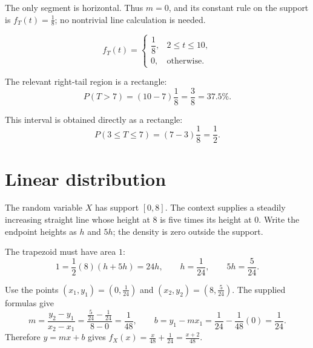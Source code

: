 	The only segment is horizontal.  Thus $m=0$, and its constant rule on the
	support is $f_T(t)=\frac18$; no nontrivial line calculation is needed.
	
	\[
	f_T(t)=\begin{cases}\dfrac18,&2\le t\le10,\\[1mm]0,&\text{otherwise.}\end{cases}
	\]
	
	The relevant right-tail region is a rectangle:
	\[
	P(T>7)=(10-7)\frac18=\frac38=37.5\%.
	\]
	
	This interval is obtained directly as a rectangle:
	\[
	P(3\le T\le7)=(7-3)\frac18=\frac12.
	\]
	
	
	\section{Linear distribution}
	
	The random variable $X$ has support $[0,8]$.  The context supplies a steadily
	increasing straight line whose height at $8$ is five times its height at $0$.
	Write the endpoint heights as $h$ and $5h$; the density is zero outside the
	support.
	
	The trapezoid must have area $1$:
	\[
	1=\frac12(8)(h+5h)=24h,\qquad h=\frac1{24},\qquad5h=\frac5{24}.
	\]
	
	Use the points $(x_1,y_1)=(0,\frac1{24})$ and
	$(x_2,y_2)=(8,\frac5{24})$.  The supplied formulas give
	\[
	m=\frac{y_2-y_1}{x_2-x_1}
	=\frac{\frac5{24}-\frac1{24}}{8-0}=\frac1{48},\qquad
	b=y_1-mx_1=\frac1{24}-\frac1{48}(0)=\frac1{24}.
	\]
	Therefore $y=mx+b$ gives $f_X(x)=\frac{x}{48}+\frac1{24}=\frac{x+2}{48}$.
	
